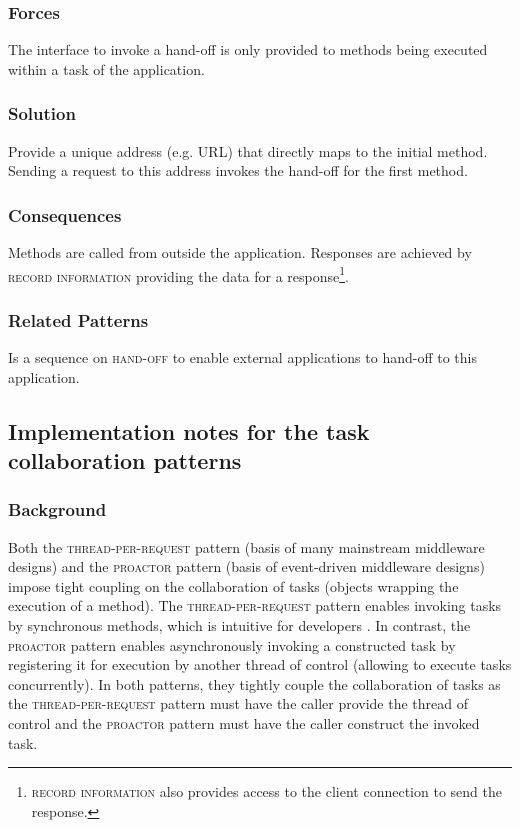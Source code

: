 \documentclass[prodmode]{style/acmlarge}
\begin{document}
\subsubsection*{Forces} The interface to invoke a hand-off is only provided to
methods being executed within a task of the application.

\subsubsection*{Solution} Provide a unique address (e.g. URL) that directly maps
to the initial method.  Sending a request to this address invokes the hand-off
for the first method.

\subsubsection*{Consequences} Methods are called from outside the application. 
Responses are achieved by \textsc{record information} providing the data for a
response\footnote{\textsc{record information} also provides access to the client
connection to send the response.}.

\subsubsection*{Related Patterns} Is a sequence on \textsc{hand-off} to enable
external applications to hand-off to this application.



\subsection{Implementation notes for the task collaboration patterns}

\subsubsection*{Background}

Both the \textsc{thread-per-request} pattern \cite{thread-per-request} (basis of
many mainstream middleware designs) and the \textsc{proactor} pattern
\cite{proactor} (basis of event-driven middleware designs) impose tight
coupling on the collaboration of tasks (objects wrapping the execution of a
method).  The \textsc{thread-per-request} pattern enables invoking tasks by
synchronous methods, which is intuitive for developers \cite{proactor}.
In contrast, the \textsc{proactor} pattern enables asynchronously invoking a
constructed task by registering it for execution by another thread of control
(allowing to execute tasks concurrently).  In both patterns, they tightly couple
the collaboration of tasks as the \textsc{thread-per-request} pattern must have
the caller provide the thread of control and the \textsc{proactor} pattern must
have the caller construct the invoked task.
\end{document}
